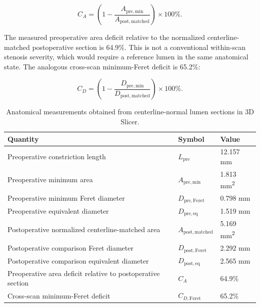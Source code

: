 \documentclass[11pt,a4paper]{article}
\begin{document}
\begin{equation}
  C_A = \left(1-\frac{A_{\mathrm{pre,min}}}
  {A_{\mathrm{post,matched}}}\right)\times 100\%.
  \label{eq:area_constriction}
\end{equation}

The measured preoperative area deficit relative to the normalized
centerline-matched postoperative section is 64.9\%. This is not a conventional
within-scan stenosis severity, which would require a reference lumen in the same
anatomical state. The analogous cross-scan minimum-Feret deficit is 65.2\%:

\begin{equation}
  C_D = \left(1-\frac{D_{\mathrm{pre,min}}}
  {D_{\mathrm{post,matched}}}\right)\times 100\%.
\end{equation}

\begin{table}[htbp]
  \centering
  \caption{Anatomical measurements obtained from centerline-normal lumen
  sections in 3D Slicer.}
  \label{tab:anatomical_measurements}
  \begin{tabular}{@{}lll@{}}
    \toprule
    Quantity & Symbol & Value \\
    \midrule
    Preoperative constriction length & $L_{\mathrm{pre}}$ & 12.157 \si{\milli\metre} \\
    Preoperative minimum area & $A_{\mathrm{pre,min}}$ & 1.813 \si{\milli\metre\squared} \\
    Preoperative minimum Feret diameter & $D_{\mathrm{pre,Feret}}$ & 0.798 \si{\milli\metre} \\
    Preoperative equivalent diameter & $D_{\mathrm{pre,eq}}$ & 1.519 \si{\milli\metre} \\
    Postoperative normalized centerline-matched area & $A_{\mathrm{post,matched}}$ & 5.169 \si{\milli\metre\squared} \\
    Postoperative comparison Feret diameter & $D_{\mathrm{post,Feret}}$ & 2.292 \si{\milli\metre} \\
    Postoperative comparison equivalent diameter & $D_{\mathrm{post,eq}}$ & 2.565 \si{\milli\metre} \\
    Preoperative area deficit relative to postoperative section & $C_A$ & 64.9\% \\
    Cross-scan minimum-Feret deficit & $C_{D,\mathrm{Feret}}$ & 65.2\% \\
    \bottomrule
  \end{tabular}
\end{table}
\end{document}
